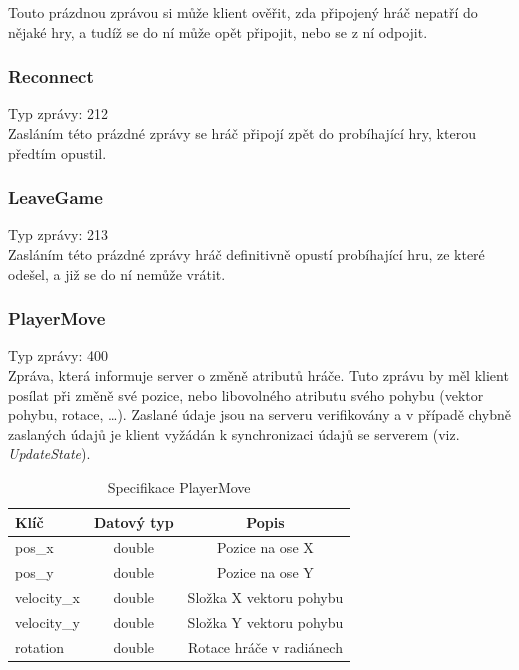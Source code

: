 \documentclass[12pt, a4paper]{article}
\begin{document}
    Touto prázdnou zprávou si může klient ověřit, zda připojený hráč nepatří do nějaké hry, a tudíž se do ní může opět připojit, nebo se z ní odpojit.

    \subsubsection*{Reconnect}
    Typ zprávy: 212\\

    Zasláním této prázdné zprávy se hráč připojí zpět do probíhající hry, kterou předtím opustil.

    \subsubsection*{LeaveGame}
    Typ zprávy: 213\\

    Zasláním této prázdné zprávy hráč definitivně opustí probíhající hru, ze které odešel, a již se do ní nemůže vrátit.
   
    \subsubsection*{PlayerMove}
    Typ zprávy: 400\\

    Zpráva, která informuje server o změně atributů hráče.
    Tuto zprávu by měl klient posílat při změně své pozice, nebo libovolného atributu svého pohybu (vektor pohybu, rotace, \dots).
    Zaslané údaje jsou na serveru verifikovány a v případě chybně zaslaných údajů je klient vyžádán k synchronizaci údajů se serverem (viz. \textit{UpdateState}).

    \begin{table}[H]
        \centering
        \begin{tabular}{|l|c|c|}
            \hline
            Klíč & Datový typ & Popis\\
            \hline
            \hline
            pos\_x & double & Pozice na ose X\\
            \hline
            pos\_y & double & Pozice na ose Y\\
            \hline
            velocity\_x & double & Složka X vektoru pohybu\\
            \hline
            velocity\_y & double & Složka Y vektoru pohybu\\
            \hline
            rotation & double & Rotace hráče v radiánech\\
            \hline
        \end{tabular}
        \caption{Specifikace PlayerMove}
    \end{table}
\end{document}
